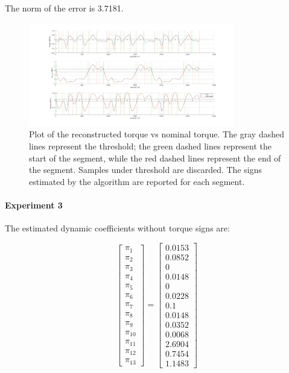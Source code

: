 \documentclass{article}
\begin{document}
The norm of the error is 3.7181.

\begin{figure}[!htbp]
\centering
\includegraphics[width=0.8\textwidth]{images/3-dof/results_experiment2.png}
\caption{Plot of the reconstructed torque vs nominal torque. The gray dashed lines represent the threshold; the green dashed lines represent the start of the segment, while the red dashed lines represent the end of the segment. Samples under threshold are discarded. The signs estimated by the algorithm are reported for each segment.}
\end{figure}
\FloatBarrier

\pagebreak

\paragraph{Experiment 3} The estimated dynamic coefficients without torque signs are:

\[\begin{bmatrix}
\pi_1 \\ \pi_2 \\ \pi_3 \\ \pi_4 \\ \pi_5 \\ \pi_6 \\ \pi_7 \\ \pi_8 \\  \pi_9 \\ \pi_{10} \\ \pi_{11} \\ \pi_{12} \\ \pi_{13}
\end{bmatrix}=\begin{bmatrix}
0.0153 \\ 0.0852 \\ 0 \\ 0.0148 \\ 0 \\ 0.0228 \\ 0.1 \\ 0.0148 \\ 0.0352 \\ 0.0068 \\ 2.6904 \\ 0.7454 \\ 1.1483
\end{bmatrix}\]
\end{document}
